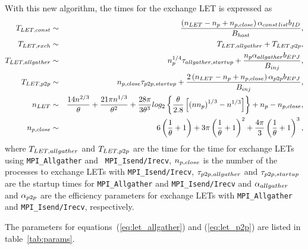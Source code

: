 \documentclass[dvipdfmx]{pasj01}
\begin{document}
With this new algorithm, the times for the exchange LET is expressed
as
\begin{eqnarray}
  T_{\rm LET, const} &\sim& \frac{\left( n_{\rm LET} - n_{\rm p} + n_{\rm p, close} \right) \alpha_{\rm const\, list} b_{\rm ID}}{B_{\rm host}}, \\
  T_{\rm LET, exch} &\sim& T_{\rm LET, allgather} + T_{\rm LET, p2p}, \\
  T_{\rm LET, allgather} &\sim& n^{1/4}_{\rm p} \tau_{\rm allgather, startup} + \frac{n_{\rm p} \alpha_{\rm allgather} b_{\rm EPJ}}{B_{\rm inj}} \label{eq:let_allgather}, \\
  T_{\rm LET, p2p} &\sim&  n_{\rm p, close} \tau_{\rm p2p, startup}  + \frac{2 \left( n_{\rm LET} - n_{\rm p} + n_{\rm p, close} \right) \alpha_{\rm p2p} b_{\rm EPJ}}{B_{\rm inj}}  \label{eq:let_p2p}, \\
  n_{\rm LET} &\sim& \frac{14n^{2/3}}{\theta} + \frac{21\pi n^{1/3}}{\theta^2} + \frac{28\pi}{3\theta^3} {\rm log_2} \left\{ \frac{\theta}{2.8}\left[\left(nn_{\rm p}\right)^{1/3} - n^{1/3}\right] \right\} + n_{\rm p} - n_{\rm p, close}, \\
  n_{\rm p, close} &\sim&  6\left( \frac{1}{\theta} + 1 \right) + 3\pi \left( \frac{1}{\theta} + 1 \right)^2 + \frac{4\pi}{3} \left( \frac{1}{\theta} + 1 \right)^3,
\end{eqnarray}
where $T_{\rm LET, allgather}$ and $T_{\rm LET, p2p}$ are the time for
the time for exchange LETs using {\tt MPI\_Allgather} and {\tt
  MPI\_Isend/Irecv}, $n_{\rm p, close}$ is the number of the processes
to exchange LETs with {\tt MPI\_Isend/Irecv}, $\tau_{\rm
  p2p,allgather}$ and $\tau_{\rm p2p,startup}$ are the startup times
for {\tt MPI\_Allgather} and {\tt MPI\_Isend/Irecv} and $\alpha_{\rm
  allgather}$ and $\alpha_{\rm p2p}$ are the efficiency parameters for
exchange LETs with {\tt MPI\_Allgather} and {\tt MPI\_Isend/Irecv},
respectively.

The parameters for equations~(\ref{eq:let_allgather}) and
(\ref{eq:let_p2p}) are listed in table~\ref{tab:params}.

\end{document}
